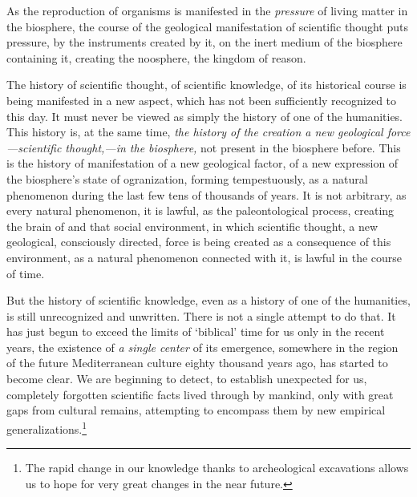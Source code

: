 As the reproduction of organisms is manifested in the \emph{pressure} of living
matter in the biosphere, the course of the geological manifestation of
scientific thought puts pressure, by the instruments created by it, on the
inert medium of the biosphere containing it, creating the noosphere, the
kingdom of reason.

The history of scientific thought, of scientific knowledge, of its historical
course is being manifested in a new aspect, which has not been sufficiently
recognized to this day.  It must never be viewed as simply the history of one
of the humanities.  This history is, at the same time, \emph{the history of the
creation a new geological force---scientific thought,---in the biosphere,} not
present in the biosphere before.  This is the history of manifestation of a new
geological factor, of a new expression of the biosphere's state of
ogranization, forming tempestuously, as a natural phenomenon during the last
few tens of thousands of years.  It is not arbitrary, as every natural
phenomenon, it is lawful, as the paleontological process, creating the brain of
 and that social environment, in which scientific thought, a
new geological, consciously directed, force is being created as a consequence
of this environment, as a natural phenomenon connected with it, is lawful in
the course of time.

But the history of scientific knowledge, even as a history of one of the
humanities, is still unrecognized and unwritten.  There is not a single attempt
to do that.  It has just begun to exceed the limits of `biblical' time for us
only in the recent years, the existence of \emph{a single center} of its
emergence, somewhere in the region of the future Mediterranean culture eighty
thousand years ago, has started to become clear.  We are beginning to detect,
to establish unexpected for us, completely forgotten scientific facts lived
through by mankind, only with great gaps from cultural remains, attempting to
encompass them by new empirical generalizations.\footnote{
	The rapid change in our knowledge thanks to archeological excavations
	allows us to hope for very great changes in the near future.
}

